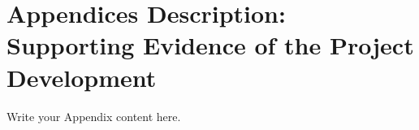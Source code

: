 
\chapter{Appendices Description: Supporting Evidence of the Project Development} %

\label{AppendixB} %

Write your Appendix content here.